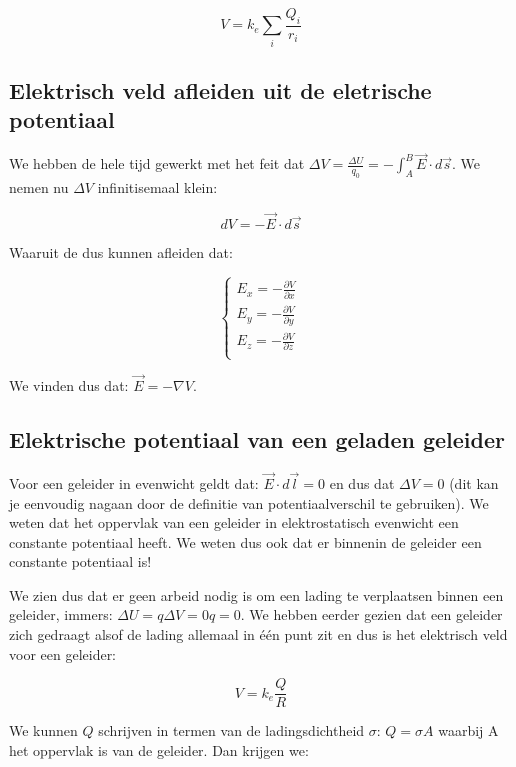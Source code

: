 \documentclass[12pt,a4paper]{article}
\begin{document}
    $$V = k_{e}\sum_{i} \frac{Q_{i}}{r_{i}}$$

    \subsection{Elektrisch veld afleiden uit de eletrische potentiaal}
    We hebben de hele tijd gewerkt met het feit dat $\Delta V = \frac{\Delta U}{q_{0}} = -\int_{A}^{B} \vec{E} \cdot d\vec{s}$. We nemen
    nu $\Delta V$ infinitisemaal klein:
    
    $$dV = -\vec{E} \cdot d\vec{s}$$
    
    Waaruit de dus kunnen afleiden dat:
    
    \begin{equation}
    	\begin{cases}
      		E_{x} = -\frac{\partial V}{\partial x}\\
      		E_{y} = -\frac{\partial V}{\partial y}\\
      		E_{z} = -\frac{\partial V}{\partial z}\\
    	\end{cases}\,
    \end{equation}
    
    We vinden dus dat: $\vec{E} = -\mathbb{\nabla}{V}$.
    
    \subsection{Elektrische potentiaal van een geladen geleider}
    Voor een geleider in evenwicht geldt dat: $\vec{E} \cdot d\vec{l} = 0$ en dus dat $\Delta V = 0$ (dit kan
    je eenvoudig nagaan door de definitie van potentiaalverschil te gebruiken). We weten dat het oppervlak van een
    geleider in elektrostatisch evenwicht een constante potentiaal heeft. We weten dus ook dat er binnenin de geleider
    een constante potentiaal is! 
    
    We zien dus dat er geen arbeid nodig is om een lading te verplaatsen binnen een geleider, immers: $\Delta U = q\Delta V = 0q = 0$.
    We hebben eerder gezien dat een geleider zich gedraagt alsof de lading allemaal in één punt zit en dus is het elektrisch veld voor een
    geleider:
    
    $$V = k_{e}\frac{Q}{R}$$
    
    We kunnen $Q$ schrijven in termen van de ladingsdichtheid $\sigma$: $Q = \sigma A$ waarbij A het oppervlak is van de geleider. Dan krijgen we:
    
\end{document}
